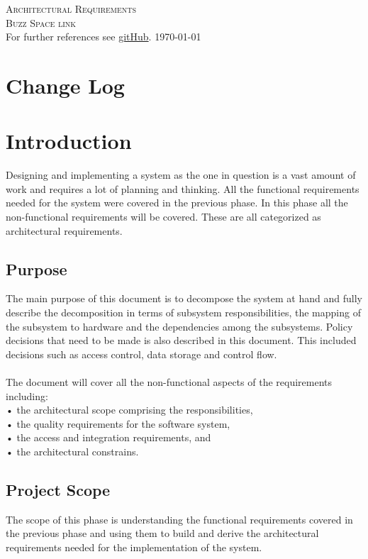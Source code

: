 \documentclass[a4paper,12pt]{report}
\begin{document}
\renewcommand{\thesection}{\arabic{section}}
\newpage
\begin{center}
\textsc{\LARGE Architectural Requirements}\\[1.5cm]
\textsc{\Large Buzz Space link}\\[0.5cm]
For further references see \href{https://github.com/COS301-Group-3-A-Phase2/Part2-Mini-Project.git}{gitHub}.
\today
\end{center}
\tableofcontents{}

\newpage

\section{Change Log}


\section{Introduction}
Designing and implementing a system as the one in question is a vast amount of work and requires a lot of planning and thinking. All the functional requirements needed for the system were covered in the previous phase. In this phase all the non-functional requirements will be covered. These are all categorized as architectural requirements.  \\
\subsection{Purpose}
The main purpose of this document is to decompose the system at hand and fully describe the decomposition in terms of subsystem responsibilities, the mapping of the subsystem to hardware and the dependencies among the subsystems. Policy decisions that need to be made is also described in this document. This included decisions such as access control, data storage and control flow.\\\\
The document will cover all the non-functional aspects of the requirements including:\\
•	the architectural scope comprising the responsibilities,\\
•	the quality requirements for the software system,\\
•	the access and integration requirements, and\\
•	the architectural constrains. \\

\subsection{Project Scope}
The scope of this phase is understanding the functional requirements covered in the previous phase and using them to build and derive the architectural requirements needed for the implementation of the system.\\
\end{document}
